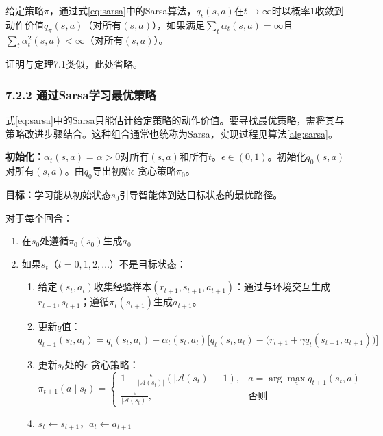 \documentclass[UTF8]{article}
\begin{document}
\begin{theorembox}[7.2 Sarsa的收敛性]
给定策略$\pi$，通过式\eqref{eq:sarsa}中的Sarsa算法，$q_t(s, a)$在$t \to \infty$时以概率1收敛到动作价值$q_\pi(s, a)$（对所有$(s, a)$），如果满足$\sum_t \alpha_t(s, a) = \infty$且$\sum_t \alpha_t^2(s, a) < \infty$（对所有$(s, a)$）。
\end{theorembox}

证明与定理7.1类似，此处省略。

\subsubsection*{7.2.2 通过Sarsa学习最优策略}

式\eqref{eq:sarsa}中的Sarsa只能估计给定策略的动作价值。要寻找最优策略，需将其与策略改进步骤结合。这种组合通常也统称为Sarsa，实现过程见算法\ref{alg:sarsa}。

\begin{tcolorbox}[
    colback=gray!5!white,
    colframe=gray!50!black,
    title=\textbf{算法7.1：通过Sarsa学习最优策略},
    fonttitle=\bfseries,
    arc=2pt, boxrule=0.8pt,
    left=3mm, right=3mm, top=2mm, bottom=2mm
]
\label{alg:sarsa}
\textbf{初始化：}$\alpha_t(s, a) = \alpha > 0$对所有$(s, a)$和所有$t$。$\epsilon \in (0, 1)$。初始化$q_0(s, a)$对所有$(s, a)$。由$q_0$导出初始$\epsilon$-贪心策略$\pi_0$。

\textbf{目标：}学习能从初始状态$s_0$引导智能体到达目标状态的最优路径。

对于每个回合：
\begin{enumerate}
    \item 在$s_0$处遵循$\pi_0(s_0)$生成$a_0$
    \item 如果$s_t$（$t = 0, 1, 2, \dots$）不是目标状态：
    \begin{enumerate}
        \item 给定$(s_t, a_t)$收集经验样本$(r_{t+1}, s_{t+1}, a_{t+1})$：通过与环境交互生成$r_{t+1}, s_{t+1}$；遵循$\pi_t(s_{t+1})$生成$a_{t+1}$。
        \item 更新$q$值：
        \[
        q_{t+1}(s_t, a_t) = q_t(s_t, a_t) - \alpha_t(s_t, a_t)\Big[q_t(s_t, a_t) - \big(r_{t+1} + \gamma q_t(s_{t+1}, a_{t+1})\big)\Big]
        \]
        \item 更新$s_t$处的$\epsilon$-贪心策略：
        \[
        \pi_{t+1}(a \mid s_t) =
        \begin{cases}
        1 - \frac{\epsilon}{|\mathcal{A}(s_t)|}(|\mathcal{A}(s_t)| - 1), & a = \arg\max_a q_{t+1}(s_t, a) \\[4pt]
        \frac{\epsilon}{|\mathcal{A}(s_t)|}, & \text{否则}
        \end{cases}
        \]
        \item $s_t \leftarrow s_{t+1}$，$a_t \leftarrow a_{t+1}$
    \end{enumerate}
\end{enumerate}
\end{tcolorbox}
\end{document}
